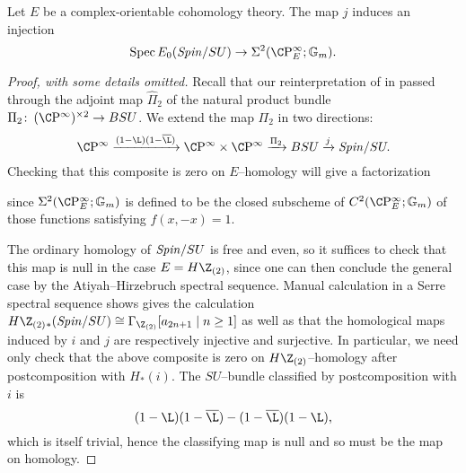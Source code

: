 \begin{lemma}\label{SpinSUComparisonMapIsInj}
Let $E$ be a complex-orientable cohomology theory.  The map $j$ induces an injection \[\Spec E_0(\Spin/SU) \to \Sigma^2(\CP^\infty_E; \Gm).\]
\end{lemma}
\begin{proof}[Proof, with some details omitted]
Recall that our reinterpretation of  in  passed through the adjoint map $\widehat \Pi_2$ of the natural product bundle $\Pi_2\co (\CP^\infty)^{\times 2} \to BSU$.  We extend the map $\Pi_2$ in two directions: \[\CP^\infty \xrightarrow{(1 - \L)(1 - \overline{\L})} \CP^\infty \times \CP^\infty \xrightarrow{\Pi_2} BSU \xrightarrow{j} \Spin/SU.\]  Checking that this composite is zero on $E$--homology will give a factorization
\begin{center}
\end{center}
since $\Sigma^2(\CP^\infty_E; \Gm)$ is defined to be the closed subscheme of $C^2(\CP^\infty_E; \Gm)$ of those functions satisfying $f(x, -x) = 1$.

The ordinary homology of $\mathit{Spin}/SU$ is free and even, so it suffices to check that this map is null in the case $E = H\Z_{(2)}$, since one can then conclude the general case by the Atiyah--Hirzebruch spectral sequence.  Manual calculation in a Serre spectral sequence shows gives the calculation $H\Z_{(2)}{}_*(\Spin/SU) \cong \Gamma_{\Z_{(2)}}[a_{2n+1} \mid n \ge 1]$ as well as that the homological maps induced by $i$ and $j$ are respectively injective and surjective.  In particular, we need only check that the above composite is zero on $H\Z_{(2)}$--homology after postcomposition with $H_*(i)$.  The $SU$--bundle classified by postcomposition with $i$ is \[(1 - \L)(1 - \overline \L) - (1 - \overline \L)(1 - \L),\] which is itself trivial, hence the classifying map is null and so must be the map on homology.


\end{proof}
